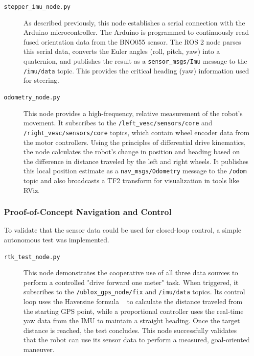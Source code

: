 \begin{description}
    \item[\texttt{stepper\_imu\_node.py}] As described previously, this node establishes a serial connection with the Arduino microcontroller. The Arduino is programmed to continuously read fused orientation data from the BNO055 sensor. The ROS 2 node parses this serial data, converts the Euler angles (roll, pitch, yaw) into a quaternion, and publishes the result as a \texttt{sensor\_msgs/Imu} message to the \texttt{/imu/data} topic. This provides the critical heading (yaw) information used for steering.

    \item[\texttt{odometry\_node.py}] This node provides a high-frequency, relative measurement of the robot's movement. It subscribes to the \texttt{/left\_vesc/sensors/core} and \texttt{/right\_vesc/sensors/core} topics, which contain wheel encoder data from the motor controllers. Using the principles of differential drive kinematics, the node calculates the robot's change in position and heading based on the difference in distance traveled by the left and right wheels. It publishes this local position estimate as a \texttt{nav\_msgs/Odometry} message to the \texttt{/odom} topic and also broadcasts a TF2 transform for visualization in tools like RViz.
\end{description}

\subsubsection{Proof-of-Concept Navigation and Control}
To validate that the sensor data could be used for closed-loop control, a simple autonomous test was implemented.

\begin{description}
    \item[\texttt{rtk\_test\_node.py}] This node demonstrates the cooperative use of all three data sources to perform a controlled "drive forward one meter" task. When triggered, it subscribes to the \texttt{/ublox\_gps\_node/fix} and \texttt{/imu/data} topics. Its control loop uses the Haversine formula ~\cite{Sinnott_Haversine} to calculate the distance traveled from the starting GPS point, while a proportional controller uses the real-time yaw data from the IMU to maintain a straight heading. Once the target distance is reached, the test concludes. This node successfully validates that the robot can use its sensor data to perform a measured, goal-oriented maneuver.
\end{description}

